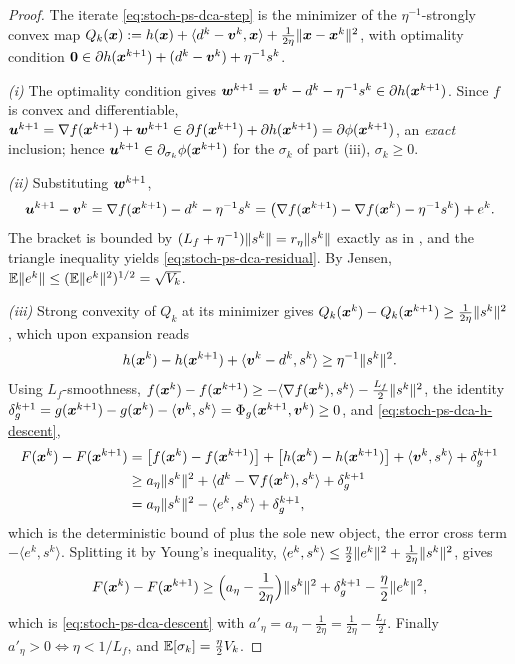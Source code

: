 \begin{proof}
The iterate \eqref{eq:stoch-ps-dca-step} is the minimizer of the
$\eta^{-1}$-strongly convex map
$Q_k(\bm{x}):=h(\bm{x})+\langle d^k-\bm{v}^k,\bm{x}\rangle
+\tfrac1{2\eta}\lVert \bm{x}-\bm{x}^k\rVert^2$, with optimality condition
$\bm{0}\in\partial h(\bm{x}^{k+1})+(d^k-\bm{v}^k)+\eta^{-1}s^k$.

\emph{(i)} The optimality condition gives
$\bm{w}^{k+1}=\bm{v}^k-d^k-\eta^{-1}s^k\in\partial h(\bm{x}^{k+1})$. Since $f$ is
convex and differentiable,
$\bm{u}^{k+1}=\nabla f(\bm{x}^{k+1})+\bm{w}^{k+1}
\in\partial f(\bm{x}^{k+1})+\partial h(\bm{x}^{k+1})=\partial\phi(\bm{x}^{k+1})$,
an \emph{exact} inclusion; hence
$\bm{u}^{k+1}\in\partial_{\sigma_k}\phi(\bm{x}^{k+1})$ for the $\sigma_k$ of
part (iii), $\sigma_k\ge0$.

\emph{(ii)} Substituting $\bm{w}^{k+1}$,
\[
    \bm{u}^{k+1}-\bm{v}^k
    =\nabla f(\bm{x}^{k+1})-d^k-\eta^{-1}s^k
    =\bigl(\nabla f(\bm{x}^{k+1})-\nabla f(\bm{x}^k)-\eta^{-1}s^k\bigr)+e^k .
\]
The bracket is bounded by $(L_f+\eta^{-1})\lVert s^k\rVert=r_\eta\lVert s^k\rVert$
exactly as in , and the triangle
inequality yields \eqref{eq:stoch-ps-dca-residual}. By Jensen,
$\mathbb{E}\lVert e^k\rVert\le(\mathbb{E}\lVert e^k\rVert^2)^{1/2}=\sqrt{V_k}$.

\emph{(iii)} Strong convexity of $Q_k$ at its minimizer gives
$Q_k(\bm{x}^k)-Q_k(\bm{x}^{k+1})\ge\tfrac1{2\eta}\lVert s^k\rVert^2$, which upon
expansion reads
\begin{equation}
    h(\bm{x}^k)-h(\bm{x}^{k+1})
    +\langle\bm{v}^k-d^k,s^k\rangle
    \ge
    \eta^{-1}\lVert s^k\rVert^2 .
    \label{eq:stoch-ps-dca-h-descent}
\end{equation}
Using $L_f$-smoothness,
$f(\bm{x}^k)-f(\bm{x}^{k+1})\ge-\langle\nabla f(\bm{x}^k),s^k\rangle
-\tfrac{L_f}2\lVert s^k\rVert^2$, the identity
$\delta_g^{k+1}=g(\bm{x}^{k+1})-g(\bm{x}^k)-\langle\bm{v}^k,s^k\rangle
=\Phi_g(\bm{x}^{k+1},\bm{v}^k)\ge0$, and \eqref{eq:stoch-ps-dca-h-descent},
\[
\begin{aligned}
    F(\bm{x}^k)-F(\bm{x}^{k+1})
    &=\bigl[f(\bm{x}^k)-f(\bm{x}^{k+1})\bigr]
    +\bigl[h(\bm{x}^k)-h(\bm{x}^{k+1})\bigr]
    +\langle\bm{v}^k,s^k\rangle
    +\delta_g^{k+1}
    \\
    &\ge
    a_\eta\lVert s^k\rVert^2
    +\langle d^k-\nabla f(\bm{x}^k),s^k\rangle
    +\delta_g^{k+1}
    \\
    &=
    a_\eta\lVert s^k\rVert^2
    -\langle e^k,s^k\rangle
    +\delta_g^{k+1} ,
\end{aligned}
\]
which is the deterministic bound of  plus
the sole new object, the error cross term $-\langle e^k,s^k\rangle$.
Splitting it by Young's inequality,
$\langle e^k,s^k\rangle
\le\tfrac\eta2\lVert e^k\rVert^2+\tfrac1{2\eta}\lVert s^k\rVert^2$, gives
\[
    F(\bm{x}^k)-F(\bm{x}^{k+1})
    \ge
    \Bigl(a_\eta-\frac1{2\eta}\Bigr)\lVert s^k\rVert^2
    +\delta_g^{k+1}
    -\frac\eta2\lVert e^k\rVert^2,
\]
which is \eqref{eq:stoch-ps-dca-descent} with
$a'_\eta=a_\eta-\tfrac1{2\eta}=\tfrac1{2\eta}-\tfrac{L_f}2$. Finally
$a'_\eta>0\iff\eta<1/L_f$, and $\mathbb{E}[\sigma_k]=\tfrac\eta2 V_k$.
\end{proof}

